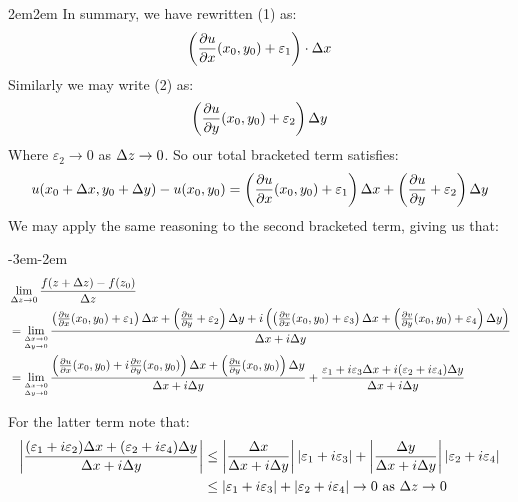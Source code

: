 \documentclass[10pt]{paper}
\newcommand{\cpr}[1]{\left(#1\right)}
\newcommand{\prt}[2]{\frac{\partial #1}{\partial #2}}
\let\endoldproof\endproof
\renewenvironment{proof}[1][\proofname]
  {\vspace{0.2cm}\begin{adjustwidth}{2em}{2em}
   \oldproof[#1]}
  {\endoldproof
\end{adjustwidth}}
\begin{document}
{\begin{proof}
  In summary, we have rewritten (1) as:
  \begin{align*}
    \cpr{\frac{\partial u}{\partial x}(x_0, y_0)+\varepsilon_1}\cdot \de x
  \end{align*}
  Similarly we may write (2) as:
  \begin{align*}
    \cpr{\frac{\partial u}{\partial y}(x_0,y_0)+\varepsilon_2}\de y
  \end{align*}
  Where $\varepsilon_2\to0$ as $\Delta z \to 0$. So our total bracketed term satisfies:
  \begin{align*}
    u(x_0 + \de x, y_0 + \de y)- u(x_0, y_0) = \cpr{\frac{\partial u}{\partial x}(x_0, y_0)+ \varepsilon_1}\de x + \cpr{\frac{\partial u}{\partial y}+\varepsilon_2}\de y
  \end{align*}
  We may apply the same reasoning to the second bracketed term, giving us that:
  {\newcommand{\xoyo}{(x_0, y_0)}\newcommand{\limterm}{\parbox{0.7cm}{\hspace{0cm}$\scriptscriptstyle\de x\to 0$\vspace{-0.2cm}\\\noindent\hspace{-0.2cm}$\scriptscriptstyle\de y \to 0$}}
  \begin{adjustwidth}{-3em}{-2em}
  \begin{align*}
    &\lim_{\de z \to 0}\frac{f(z + \de z)-f(z_0)}{\de z}\\
    &= \lim_{\limterm}\frac{\cpr{\prt{u}x\xoyo+\varepsilon_1}\de x + \cpr{\prt{u}y + \varepsilon_2}\de y + i\cpr{\cpr{\prt{v}x\xoyo + \varepsilon_3}\de x + \cpr{\prt{v}y\xoyo + \varepsilon_4}\de y}}{\de x + i \de y}\\
    &= \lim_{\limterm}\frac{\cpr{\prt{u}x\xoyo + i \prt{v}y\xoyo}\de x + \cpr{\prt{u}y\xoyo}\de y}{\de x + i\de y}+\frac{\varepsilon_1+i\varepsilon_3 \de x + i(\varepsilon_2 + i\varepsilon_4) \de y}{\de x + i \de y}
  \end{align*}
  \end{adjustwidth}
  For the latter term note that:
  \begin{align*}
    \left|\frac{(\varepsilon_1 + i\varepsilon_2) \Delta x + (\varepsilon_2 + i\varepsilon_4)\Delta y}{\Delta x + i\Delta y}\right|&\le\left|\frac{\Delta x}{\Delta x + i\Delta y}\right||\varepsilon_1 + i \varepsilon_3| + \left|\frac{\Delta y}{\Delta x + i \Delta{y}}\right||\varepsilon_2 + i\varepsilon_4|\\
    &\le |\varepsilon_1 + i\varepsilon_3| + |\varepsilon_2 + i\varepsilon_4| \to 0 \text{ as }\Delta z \to 0
  \end{align*}
}
\end{proof}}
\end{document}
